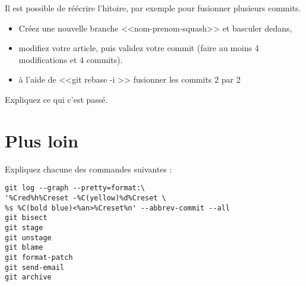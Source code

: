 \documentclass[a4paper]{article}
\begin{document}
Il est possible de réécrire l'hitoire, par exemple pour fusionner plusieurs commits.

\begin{itemize}
  \item Créez une nouvelle branche <<nom-prenom-squash>> et basculer dedans,
  \item modifiez votre article, puis validez votre commit (faire au moins 4 modifications et 4 commits). 
  \item à l'aide de <<git rebase -i >> fusionner les commits 2 par 2
\end{itemize}

Expliquez ce qui c'est passé.

\section{Plus loin}

Expliquez chacune des commandes suivantes :
\begin{verbatim}
git log --graph --pretty=format:\
'%Cred%h%Creset -%C(yellow)%d%Creset \
%s %C(bold blue)<%an>%Creset%n' --abbrev-commit --all
git bisect
git stage
git unstage
git blame 
git format-patch
git send-email
git archive
\end{verbatim}
\end{document}
